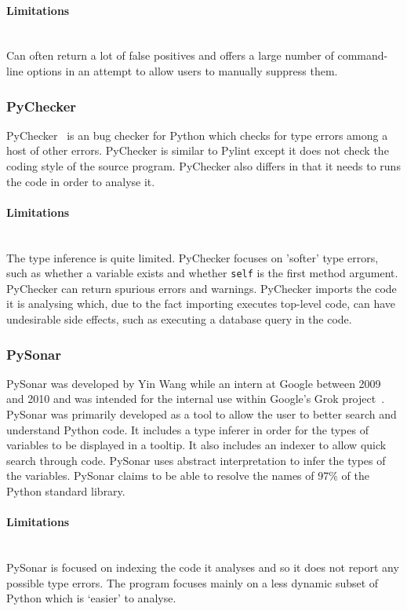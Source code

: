 \documentclass[12pt, titlepage]{article}
\begin{document}
\paragraph{Limitations}\mbox{}\\
Can often return a lot of false positives and offers a large number of command-line options in an attempt to allow users to manually suppress them.

\subsubsection{PyChecker}
PyChecker~\cite{pychecker} is an bug checker for Python which checks for type errors among a host of other errors. PyChecker is similar to Pylint except it does not check the coding style of the source program. PyChecker also differs in that it needs to runs the code in order to analyse it.
\paragraph{Limitations}\mbox{}\\
The type inference is quite limited. PyChecker focuses on 'softer' type errors, such as whether a variable exists and whether \texttt{self} is the first method argument. \\
\indent PyChecker can return spurious errors and warnings. PyChecker imports the code it is analysing which, due to the fact importing executes top-level code, can have undesirable side effects, such as executing a database query in the code.

\subsubsection{PySonar}
PySonar was developed by Yin Wang while an intern at Google between 2009 and 2010 and was intended for the internal use within Google's Grok project~\cite{pySonar}. PySonar was primarily developed as a tool to allow the user to better search and understand Python code. It includes a type inferer in order for the types of variables to be displayed in a tooltip. It also includes an indexer to allow quick search through code. PySonar uses abstract interpretation to infer the types of the variables. PySonar claims to be able to resolve the names of 97\% of the Python standard library.
\paragraph{Limitations}\mbox{}\\
PySonar is focused on indexing the code it analyses and so it does not report any possible type errors. The program focuses mainly on a less dynamic subset of Python which is `easier' to analyse.
\end{document}
